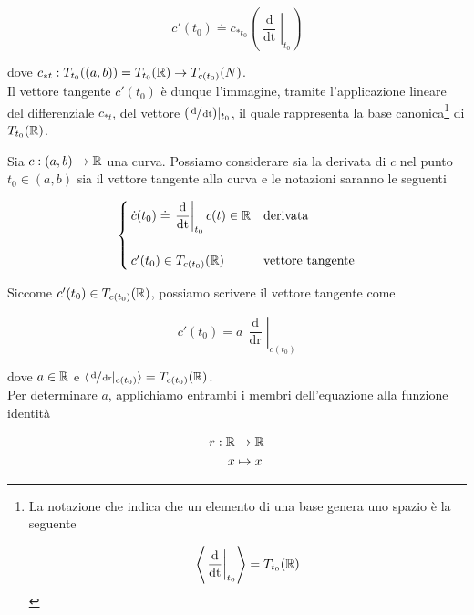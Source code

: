 \begin{equation}
	c'(t_{0}) \doteq c_{*t_{0}} \left( \left. \dfrac{\operatorname{d}}{\operatorname{dt}} \right|_{t_{0}} \right)
\end{equation}

dove $ c_{*t} : T_{t_{0}}((a,b)) = T_{t_{0}}(\mathbb{R}) \to T_{c(t_{0})}(N) $.\\
Il vettore tangente $ c'(t_{0}) $ è dunque l'immagine, tramite l'applicazione lineare del differenziale $ c_{*t} $, del vettore $ (\sfrac{\operatorname{d}}{\operatorname{dt}}) |_{t_{0}} $, il quale rappresenta la base canonica\footnote{%
	La notazione che indica che un elemento di una base genera uno spazio è la seguente
	
	\begin{equation}
		\left\langle \left. \dfrac{\operatorname{d}}{\operatorname{dt}} \right|_{t_{0}} \right\rangle = T_{t_{0}}(\mathbb{R})
	\end{equation}%
} di $ T_{t_{0}}(\mathbb{R}) $.

\begin{remark}
	Sia $ c : (a,b) \to \mathbb{R} $ una curva. Possiamo considerare sia la derivata di $ c $ nel punto $ t_{0} \in (a,b) $ sia il vettore tangente alla curva e le notazioni saranno le seguenti
	
	\begin{equation}
		\begin{cases}
			\dot{c}(t_{0}) \doteq \left. \dfrac{\operatorname{d}}{\operatorname{dt}} \right|_{t_{0}} c(t) \in \mathbb{R} & \text{derivata}\\\\
			c'(t_{0}) \in T_{c(t_{0})}(\mathbb{R}) & \text{vettore tangente}
		\end{cases}
	\end{equation}
\end{remark}

Siccome $ c'(t_{0}) \in T_{c(t_{0})}(\mathbb{R}) $, possiamo scrivere il vettore tangente come

\begin{equation}
	c'(t_{0}) = a \, \left. \dfrac{\operatorname{d}}{\operatorname{dr}} \right|_{c(t_{0})}
\end{equation}

dove $ a \in \mathbb{R} $ e $ \langle \sfrac{\operatorname{d}}{\operatorname{dr}} |_{c(t_{0})} \rangle = T_{c(t_{0})}(\mathbb{R}) $.\\
Per determinare $ a $, applichiamo entrambi i membri dell'equazione alla funzione identità

\begin{align}
	\begin{split}
		r : \mathbb{R} &\to \mathbb{R}\\
		x &\mapsto x
	\end{split}
\end{align}

